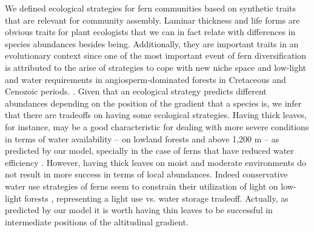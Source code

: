 \documentclass[12pt]{article}
\begin{document}
We defined ecological strategies for fern
communities based on synthetic traits that are relevant for community
assembly. 
Laminar thickness and life forms are obvious traits for
plant ecologists that we can in fact relate with differences in species
abundances besides being.
Additionally,
they are important traits in an evolutionary context since one of the most important event
of fern diversification is attributed to the arise of strategies to cope with
new niche space and low-light and water requirements in angiosperm-dominated forests in Cretaceous and
Cenozoic periods. 
\citep{Schneider2004, Schuettpelz2009}.
Given that an ecological strategy predicts
different abundances depending on the position of the gradient that a
species is, we infer that there are tradeoffs on having some
ecological strategies. Having thick leaves, for instance, may be a
good
characteristic for dealing with more severe conditions in terms of
water availability -- on lowland forests and above 1,200 m -- as
predicted by our model, specially in the case of ferns that have
reduced water efficiency \citep{Page2002,
Watkins2012,Vasco2013}. However, having thick leaves on moist and
moderate environments do not result in more success in terms of local
abundances. 
Indeed conservative water use strategies of ferns seem to
constrain their utilization of light on low-light forests
\citep{Zhang2009}, representing a light use vs. water storage tradeoff.
Actually, as predicted by our model it is worth having thin leaves to
be successful in intermediate positions of the altitudinal
gradient. 
\end{document}
